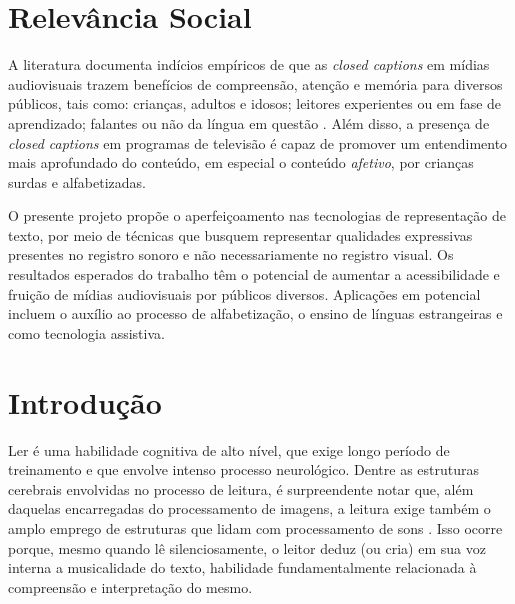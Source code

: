 \documentclass[a4paper,11pt,titlepage,singlespacing]{article}
\begin{document}
\newpage


\thispagestyle{empty}
\newpage


\newpage

\section*{Relevância Social}

\noindent A literatura documenta indícios empíricos de que as \emph{closed captions} em mídias audiovisuais trazem benefícios de compreensão, atenção e memória para diversos públicos, tais como: crianças, adultos e idosos; leitores experientes ou em fase de aprendizado; falantes ou não da língua em questão \cite{fiske_video_2015}. Além disso, a presença de \emph{closed captions} em programas de televisão é capaz de promover um entendimento mais aprofundado do conteúdo, em especial o conteúdo \emph{afetivo}, por crianças surdas e alfabetizadas\cite{murphy-berman_impact_1983}.

O presente projeto propõe o aperfeiçoamento nas tecnologias de representação de texto, por meio de técnicas que busquem representar qualidades expressivas presentes no registro sonoro e não necessariamente no registro visual. Os resultados esperados do trabalho têm o potencial de aumentar a acessibilidade e fruição de mídias audiovisuais por públicos diversos. Aplicações em potencial incluem o auxílio ao processo de alfabetização, o ensino de línguas estrangeiras e como tecnologia assistiva.

\newpage


\thispagestyle{empty}
\newpage
{}


\renewcommand{\contentsname}{Sumário}
\tableofcontents

\newpage

\section{Introdução}

\noindent Ler é uma habilidade cognitiva de alto nível, que exige longo período de treinamento e que envolve intenso processo neurológico. Dentre as estruturas cerebrais envolvidas no processo de leitura, é surpreendente notar que, além daquelas encarregadas do processamento de imagens, a leitura exige também o amplo emprego de estruturas que lidam com processamento de sons \cite[cap.7]{seidenberg2017}. Isso ocorre porque, mesmo quando lê silenciosamente, o leitor deduz (ou cria) em sua voz interna a musicalidade do texto, habilidade fundamentalmente relacionada à compreensão e interpretação do mesmo.
\end{document}
